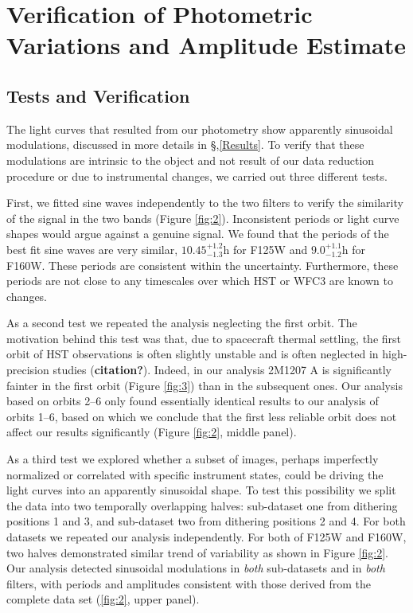 \documentclass[apj]{emulateapj}
\begin{document}
\section{Verification of Photometric Variations and Amplitude
  Estimate}

\subsection{Tests and Verification}

The light curves that resulted from our photometry show apparently
sinusoidal modulations, discussed in more details in
\S,\ref{Results}. To verify that these modulations are intrinsic to
the object and not result of our data reduction procedure or due to
instrumental changes, we carried out three different tests.

First, we fitted sine waves independently to the two filters to verify
the similarity of the signal in the two bands (Figure \ref{fig:2}). Inconsistent periods or
light curve shapes would argue against a genuine signal.  We found
that the periods of the best fit sine waves are very similar,
$10.45^{+1.2}_{-1.3}$h for F125W and $9.0^{+1.1}_{-1.2}$h for
F160W. These periods are consistent within the
uncertainty. Furthermore, these periods are not close to any
timescales over which HST or WFC3 are known to changes.

 As a second test we repeated the analysis neglecting the first
 orbit. The motivation behind this test was that, due to spacecraft
 thermal settling, the first orbit of HST observations is often
 slightly unstable and is often neglected in high-precision studies
 (\textbf{citation?}). Indeed, in our analysis 2M1207 A is
 significantly fainter in the first orbit (Figure \ref{fig:3}) than in
 the subsequent ones.
 Our analysis based on orbits 2--6 only found essentially identical
 results to our analysis of orbits 1--6, based on which we conclude
 that the first less reliable orbit does not affect our results
 significantly (Figure \ref{fig:2}, middle panel).

As a third test we explored whether a subset of images, perhaps
imperfectly normalized or correlated with specific instrument states,
could be driving the light curves into an apparently sinusoidal
shape. To test this possibility we split the data into two temporally
overlapping halves: sub-dataset one from dithering positions 1 and 3,
and sub-dataset two from dithering positions 2 and 4. For both
datasets we repeated our analysis independently.  For both of F125W
and F160W, two halves demonstrated similar trend of variability as
shown in Figure \ref{fig:2}.  Our analysis detected sinusoidal
modulations in {\em both} sub-datasets and in {\em both} filters, with
periods and amplitudes consistent with those derived from the complete
data set (\ref{fig:2}, upper panel).
 
\end{document}
